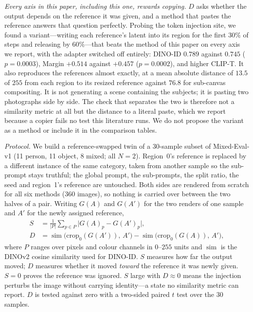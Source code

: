 \documentclass[10pt,twocolumn,letterpaper]{article}
\begin{document}
\noindent\textit{Every axis in this paper, including this one, rewards
copying.}
$D$ asks whether the output depends on the reference it was given, and a
method that pastes the reference answers that question perfectly.  Probing
the token injection site, we found a variant---writing each reference's
latent into its region for the first $30\%$ of steps and releasing by
$60\%$---that beats the method of this paper on every axis we report, with
the adapter switched off entirely: DINO-ID $0.789$ against $0.745$
($p{=}0.0003$), Margin $+0.514$ against $+0.457$ ($p{=}0.0002$), and higher
CLIP-T.  It also reproduces the references almost exactly, at a mean absolute
distance of $13.5$ of $255$ from each region to its resized reference against
$76.8$ for sub-canvas compositing.  It is not generating a scene containing
the subjects; it is pasting two photographs side by side.  The check that
separates the two is therefore not a similarity metric at all but the
distance to a literal paste, which we report because a copier fails no test
this literature runs.  We do not propose the variant as a method or include
it in the comparison tables.

\noindent\textit{Protocol.}
We build a reference-swapped twin of a 30-sample subset of Mixed-Eval-v1
(11 person, 11 object, 8 mixed; all $N{=}2$).  Region~0's reference is
replaced by a different instance of the same category, taken from another
sample so the sub-prompt stays truthful; the global prompt, the sub-prompts,
the split ratio, the seed and region~1's reference are untouched.  Both sides
are rendered from scratch for all six methods (360 images), so nothing is
carried over between the two halves of a pair.  Writing $G(A)$ and $G(A')$
for the two renders of one sample and $A'$ for the newly assigned reference,
\begin{align}
  S &= \tfrac{1}{|P|}\textstyle\sum_{p\in P}
       \bigl|G(A)_p - G(A')_p\bigr|, \label{eq:swapS}\\
  D &= \operatorname{sim}\!\bigl(\mathrm{crop}_0(G(A')),\,A'\bigr)
     - \operatorname{sim}\!\bigl(\mathrm{crop}_0(G(A)),\,A'\bigr),
       \label{eq:swapD}
\end{align}
where $P$ ranges over pixels and colour channels in $0$--$255$ units and
$\operatorname{sim}$ is the DINOv2 cosine similarity used for DINO-ID.
$S$ measures how far the output moved; $D$ measures whether it moved
\emph{toward} the reference it was newly given.  $S{=}0$ proves the reference
was ignored.  $S$ large with $D{\approx}0$ means the injection perturbs the
image without carrying identity---a state no similarity metric can report.
$D$ is tested against zero with a two-sided paired $t$ test over the 30
samples.
\end{document}
